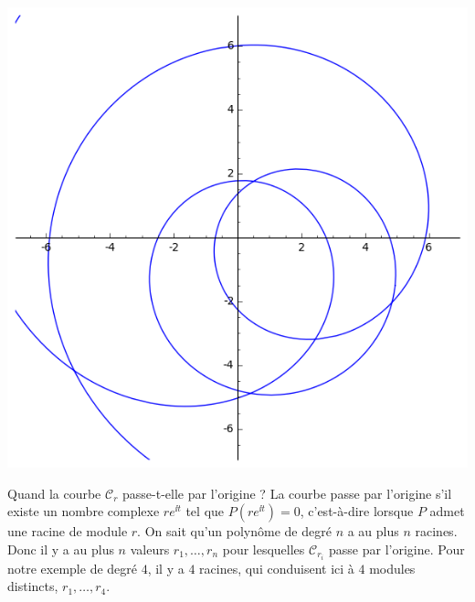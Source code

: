 \documentclass[class=report,crop=false]{standalone}
\begin{document}
\begin{center}
\includegraphics[scale=0.3]{figures/polynome6}
\end{center}

Quand la courbe $\mathcal{C}_r$ passe-t-elle par l'origine ? La courbe passe par l'origine
s'il existe un nombre complexe $re^{\ii t}$ tel que $P(re^{\ii t}) = 0$, c'est-à-dire lorsque 
$P$ admet une racine de module $r$. %
On sait qu'un polynôme de degré $n$ a au plus $n$ racines. 
Donc il y a au plus $n$ valeurs $r_1,\ldots,r_n$ pour lesquelles 
$\mathcal{C}_{r_i}$ passe par l'origine.
Pour notre exemple de degré $4$, il y a $4$ racines, qui conduisent ici à $4$ modules distincts,
$r_1,\ldots,r_4$.

\medskip
\end{document}
